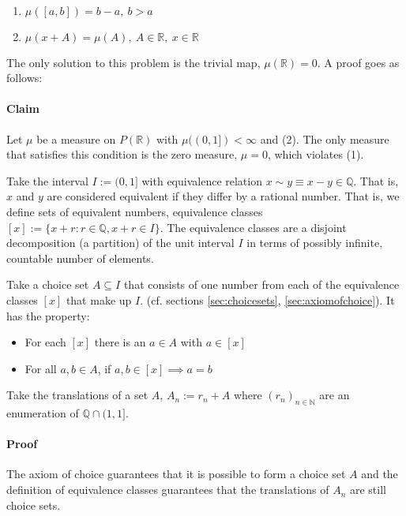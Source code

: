 \paragraph{}
\begin{enumerate}
\item $\mu([a,b]) = b-a,\ b>a$
\item $\mu(x+A) = \mu(A),\ A\in\mathbb{R},\ x\in\mathbb{R}$	 
\end{enumerate}

The only solution to this problem is the trivial map, $\mu(\mathbb{R}) = 0$. A proof goes as follows:

\paragraph{Claim}
Let $\mu$ be a measure on $P(\mathbb{R})$ with $ \mu ((0,1]) < \infty  $ and (2). The only measure that satisfies this condition is the zero measure, $\mu = 0$, which violates (1).

Take the interval $I:=(0,1]$ with equivalence relation $x\sim y \equiv x-y \in \mathbb{Q}$. That is, $x$ and $y$ are considered equivalent if they differ by a rational number. That is, we define sets of equivalent numbers, equivalence classes  $ [x] := \{ x+r: r \in \mathbb{Q}, x+r \in I \} $. The equivalence classes are a disjoint decomposition (a partition) of the unit interval $I$ in terms of possibly infinite, countable number of elements.

Take a choice set  $A\subseteq I$ that consists of one number from each of the equivalence classes $[x]$ that make up $I$. (cf. sections \ref{sec:choicesets}, \ref{sec:axiomofchoice}). It has the property: 
\begin{itemize}
\item For each $[x]$ there is an $a\in A$ with $a \in [x]$ 
\item For all $a,b \in A$, if $a,b \in [x] \implies a=b$ 
\end{itemize}

Take the translations of a set $A$, $A_n := r_n + A$ where $(r_n)_{n\in\mathbb{N}}$  are an enumeration of $\mathbb{Q}\cap(1,1]$. 

\paragraph{Proof}
The axiom of choice guarantees that it is possible to form a choice set $A$ and the definition of equivalence classes guarantees that the translations of $A_n$ are still choice sets. 

